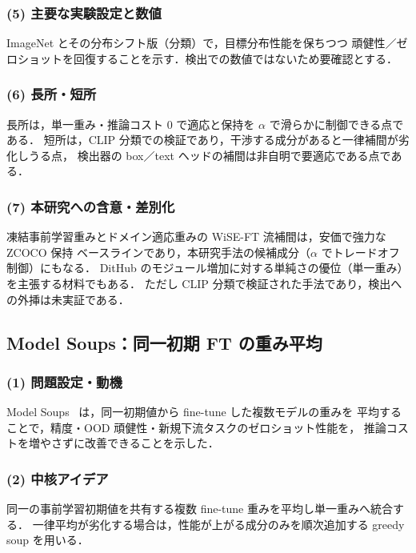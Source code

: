\subsubsection*{(5) 主要な実験設定と数値}
ImageNet とその分布シフト版（分類）で，目標分布性能を保ちつつ
頑健性／ゼロショットを回復することを示す．検出での数値ではないため要確認とする．

\subsubsection*{(6) 長所・短所}
長所は，単一重み・推論コスト 0 で適応と保持を $\alpha$ で滑らかに制御できる点である．
短所は，CLIP 分類での検証であり，干渉する成分があると一律補間が劣化しうる点，
検出器の box／text ヘッドの補間は非自明で要適応である点である．

\subsubsection*{(7) 本研究への含意・差別化}
凍結事前学習重みとドメイン適応重みの WiSE-FT 流補間は，安価で強力な ZCOCO 保持
ベースラインであり，本研究手法の候補成分（$\alpha$ でトレードオフ制御）にもなる．
DitHub のモジュール増加に対する単純さの優位（単一重み）を主張する材料でもある．
ただし CLIP 分類で検証された手法であり，検出への外挿は未実証である．

\subsection{Model Soups：同一初期 FT の重み平均}
\label{sub:modelsoups}

\subsubsection*{(1) 問題設定・動機}
Model Soups~\cite{modelsoups} は，同一初期値から fine-tune した複数モデルの重みを
平均することで，精度・OOD 頑健性・新規下流タスクのゼロショット性能を，
推論コストを増やさずに改善できることを示した．

\subsubsection*{(2) 中核アイデア}
同一の事前学習初期値を共有する複数 fine-tune 重みを平均し単一重みへ統合する．
一律平均が劣化する場合は，性能が上がる成分のみを順次追加する greedy soup を用いる．

